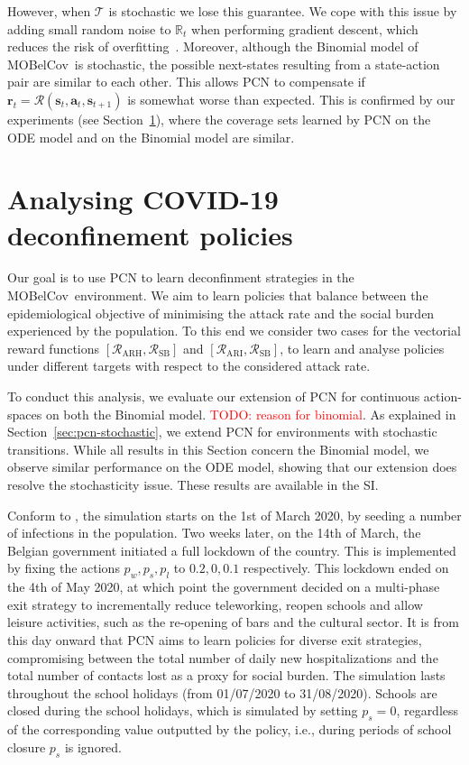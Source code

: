 \documentclass{article}
\renewcommand{\cite}[1]{\citep{#1}}
\newcommand\todo[1]{\textcolor{red}{TODO: #1}}
\newcommand{\mdptransition}{\mathcal{T}}
\newcommand{\mdprewardfn}{\mathcal{R}}
\newcommand{\momdprewardfn}{\bm{\mathcal{R}}}
\newcommand{\mdpstate}{\mathbf{s}}
\newcommand{\momdpreward}{\mathbf{r}}
\newcommand{\mdpaction}{\mathbf{a}}
\newcommand{\momdpname}{MOBelCov}
\begin{document}
However, when $\mdptransition$ is stochastic we lose this guarantee. We cope with this issue by adding small random noise to $\mathbb{R}_t$ when performing gradient descent, which reduces the risk of overfitting~\cite{zur2009noise}. Moreover, although the Binomial model of \momdpname\ is stochastic, the possible next-states resulting from a state-action pair are similar to each other. This allows PCN to compensate if $\momdpreward_t = \momdprewardfn(\mdpstate_t, \mdpaction_t, \mdpstate_{t+1})$ is somewhat worse than expected. This is confirmed by our experiments (see Section~\ref{sec:experiments}), where the coverage sets learned by PCN on the ODE model and on the Binomial model are similar.

\section{Analysing COVID-19 deconfinement policies}
\label{sec:experiments}
Our goal is to use PCN to learn deconfinment strategies in the \momdpname\ environment. We aim to learn policies that balance between the epidemiological objective of minimising the attack rate and the social burden experienced by the population. To this end we consider two cases for the vectorial reward functions $[\mdprewardfn_\text{ARH}, \mdprewardfn_\text{SB}]$ and $[\mdprewardfn_\text{ARI}, \mdprewardfn_\text{SB}]$, to learn and analyse policies under different targets with respect to the considered attack rate.

To conduct this analysis, we evaluate our extension of PCN for continuous action-spaces on both the Binomial model. \todo{reason for binomial}. As explained in Section~\ref{sec:pcn-stochastic}, we extend PCN for environments with stochastic transitions. While all results in this Section concern the Binomial model, we observe similar performance on the ODE model, showing that our extension does resolve the stochasticity issue. These results are available in the SI.

Conform to \citet{abrams2021modelling}, the simulation starts on the 1st of March 2020, by seeding a number of infections in the population. Two weeks later, on the 14th of March, the Belgian government initiated a full lockdown of the country. This is implemented by fixing the actions $p_w, p_s, p_l$ to $0.2, 0, 0.1$ respectively. This lockdown ended on the 4th of May 2020, at which point the government decided on a multi-phase exit strategy to incrementally reduce teleworking, reopen schools and allow leisure activities, such as the re-opening of bars and the cultural sector. It is from this day onward that PCN aims to learn policies for diverse exit strategies, compromising between the total number of daily new hospitalizations and the total number of contacts lost as a proxy for social burden. The simulation lasts throughout the school holidays (from 01/07/2020 to 31/08/2020). Schools are closed during the school holidays, which is simulated by setting $p_s = 0$, regardless of the corresponding value outputted by the policy, i.e., during periods of school closure $p_s$ is ignored.
\end{document}
